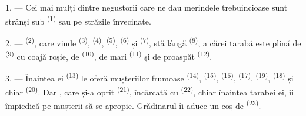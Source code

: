 %

\VUsaut{4.0mm}
\VUsaut{3.0mm}

\VUsaut{3.0mm}

1. --- Cei mai mulți dintre negustorii care ne dau merindele trebuincioase sunt
strânși sub  \textsuperscript{(1)}  sau pe străzile
învecinate.

2. ---  \textsuperscript{(2)}, care vinde 
\textsuperscript{(3)},  \textsuperscript{(4)},
 \textsuperscript{(5)}, 
\textsuperscript{(6)} și  \textsuperscript{(7)}, stă lângă
 \textsuperscript{(8)}, a cărei tarabă este
plină de  \textsuperscript{(9)} cu coajă roșie, de
 \textsuperscript{(10)}, de  mari
\textsuperscript{(11)} și de  proaspăt \textsuperscript{(12)}.

3. --- Înaintea ei  \textsuperscript{(13)} le oferă
mușteriilor  frumoase \textsuperscript{(14)}, 
\textsuperscript{(15)},  \textsuperscript{(16)}, 
\textsuperscript{(17)},  \textsuperscript{(19)},
 \textsuperscript{(18)} și chiar 
\textsuperscript{(20)}. Dar , care și-a oprit  \textsuperscript{(21)}, încărcată cu 
\textsuperscript{(22)}, chiar înaintea tarabei ei, îi împiedică pe mușterii să se
apropie. Grădinarul îi aduce un coș de  \textsuperscript{(23)}.

